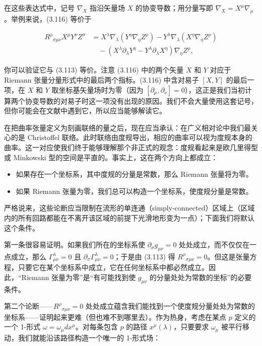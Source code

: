 在这些表达式中，记号 $\nabla_X$ 指沿矢量场 $X$ 的协变导数；用分量写即 $\nabla_X = X^\mu\nabla_\mu$。举例来说，(3.116) 等价于

\begin{align*}
R^\rho{}_{\sigma\mu\nu} X^\mu Y^\nu Z^\sigma &= X^\lambda\nabla_\lambda(Y^\eta\nabla_\eta Z^\rho) - Y^\lambda\nabla_\lambda(X^\eta\nabla_\eta Z^\rho)\\
&\quad - (X^\lambda\partial_\lambda Y^\eta - Y^\lambda\partial_\lambda X^\eta)\nabla_\eta Z^\rho, \tag{3.117}
\end{align*}

你可以验证它与 (3.113) 等价。注意 (3.116) 中的两个矢量 $X$ 和 $Y$ 对应于 Riemann 张量分量形式中的最后两个指标。(3.116) 中含对易子 $[X, Y]$ 的最后一项，在 $X$ 和 $Y$ 取坐标基矢量场时为零（因为 $[\partial_\mu, \partial_\nu] = 0$），这正是我们当初计算两个协变导数的对易子时这一项没有出现的原因。我们不会大量使用这套记号，但你可能会在文献中遇到它，所以应当能够解读它。

在把曲率张量定义为刻画联络的量之后，现在应当承认：在广义相对论中我们最关心的是 Christoffel 联络。此时联络由度规导出，相应的曲率可以视为度规本身的曲率。这一对应使我们终于能够理解那个非正式的观念：度规看起来是欧几里得型或 Minkowski 型的空间是平直的。事实上，这在两个方向上都成立：

\begin{itemize}
\item 如果存在一个坐标系，其中度规的分量是常数，那么 Riemann 张量将为零。
\item 如果 Riemann 张量为零，我们总可以构造一个坐标系，使度规分量是常数。
\end{itemize}

严格说来，这些论断应当限制在流形的单连通（simply-connected）区域上（区域内的所有回路都能在不离开该区域的前提下光滑地形变为一点）；下面我们将默认这个条件。

第一条很容易证明。如果我们所在的坐标系使 $\partial_\sigma g_{\mu\nu} = 0$ 处处成立，而不仅仅在一点成立，那么 $\Gamma^\lambda_{\mu\nu} = 0$ 且 $\partial_\sigma\Gamma^\lambda_{\mu\nu} = 0$；于是由 (3.113) 得 $R^\rho{}_{\sigma\mu\nu} = 0$。但这是张量方程，只要它在某个坐标系中成立，它在任何坐标系中都必然成立。因此，“Riemann 张量为零”是“有可能找到使 $g_{\mu\nu}$ 的分量处处为常数的坐标”的必要条件。

第二个论断——$R^\rho{}_{\sigma\mu\nu} = 0$ 处处成立蕴含我们能找到一个使度规分量处处为常数的坐标系——证明起来更难（但也难不到哪里去）。作为热身，考虑在某点 $p$ 定义的一个 1-形式 $\omega = \omega_\mu dx^\mu$。对每条包含 $p$ 的路径 $x^\mu(\lambda)$，只要要求 $\omega_\mu$ 被平行移动，我们就能沿该路径构造一个唯一的 1-形式场：

